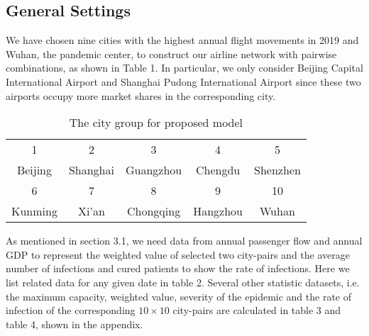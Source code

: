 \subsection{General Settings}
We have chosen nine cities with the highest annual flight movements in 2019 and Wuhan, the pandemic center, to construct our airline network with pairwise combinations, as shown in Table 1. In particular, we only consider Beijing Capital International Airport and Shanghai Pudong International Airport since these two airports occupy more market shares in the corresponding city. 
\begin{table}[H]
    \centering
    \caption{The city group for proposed model}
    \setlength{\tabcolsep}{1pt}
    \begin{tabular}{ccccc}
        \toprule
         1 & 2 & 3 & 4 & 5 \\
         Beijing & Shanghai & Guangzhou & Chengdu & Shenzhen \\
        \toprule
        6 & 7 & 8 & 9 & 10 \\
        Kunming & Xi'an & Chongqing & Hangzhou & Wuhan \\
        \bottomrule
    \end{tabular}
    \label{table1}
\end{table}
As mentioned in section 3.1, we need data from annual passenger flow and annual GDP to represent the weighted value of selected two city-pairs and the average number of infections and cured patients to show the rate of infections. Here we list related data for any given date in table 2. Several other statistic datasets, i.e. the maximum capacity, weighted value, severity of the epidemic and the rate of infection of the corresponding $10\times 10$ city-pairs are calculated in table 3 and table 4, shown in the appendix.


